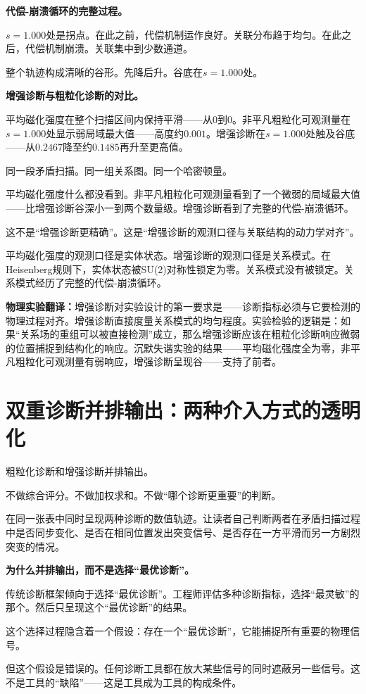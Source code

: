 \documentclass[11pt,a4paper]{book}
\theoremstyle{definition}
\begin{document}
\textbf{代偿-崩溃循环的完整过程。}

$s=1.000$处是拐点。在此之前，代偿机制运作良好。关联分布趋于均匀。在此之后，代偿机制崩溃。关联集中到少数通道。

整个轨迹构成清晰的谷形。先降后升。谷底在$s=1.000$处。

\textbf{增强诊断与粗粒化诊断的对比。}

平均磁化强度在整个扫描区间内保持平滑——从0到0。非平凡粗粒化可观测量在$s=1.000$处显示弱局域最大值——高度约$0.001$。增强诊断在$s=1.000$处触及谷底——从$0.2467$降至约$0.1485$再升至更高值。

同一段矛盾扫描。同一组关系图。同一个哈密顿量。

平均磁化强度什么都没看到。非平凡粗粒化可观测量看到了一个微弱的局域最大值——比增强诊断谷深小一到两个数量级。增强诊断看到了完整的代偿-崩溃循环。

这不是“增强诊断更精确”。这是“增强诊断的观测口径与关联结构的动力学对齐”。

平均磁化强度的观测口径是实体状态。增强诊断的观测口径是关系模式。在Heisenberg规则下，实体状态被SU(2)对称性锁定为零。关系模式没有被锁定。关系模式经历了完整的代偿-崩溃循环。

\textbf{物理实验翻译：}增强诊断对实验设计的第一要求是——诊断指标必须与它要检测的物理过程对齐。增强诊断直接度量关系模式的均匀程度。实验检验的逻辑是：如果“关系场的重组可以被直接检测”成立，那么增强诊断应该在粗粒化诊断响应微弱的位置捕捉到结构化的响应。沉默失谐实验的结果——平均磁化强度全为零，非平凡粗粒化可观测量有弱响应，增强诊断呈现谷——支持了前者。

\section{双重诊断并排输出：两种介入方式的透明化}

粗粒化诊断和增强诊断并排输出。

不做综合评分。不做加权求和。不做“哪个诊断更重要”的判断。

在同一张表中同时呈现两种诊断的数值轨迹。让读者自己判断两者在矛盾扫描过程中是否同步变化、是否在相同位置发出突变信号、是否存在一方平滑而另一方剧烈突变的情况。

\textbf{为什么并排输出，而不是选择“最优诊断”。}

传统诊断框架倾向于选择“最优诊断”。工程师评估多种诊断指标，选择“最灵敏”的那个。然后只呈现这个“最优诊断”的结果。

这个选择过程隐含着一个假设：存在一个“最优诊断”，它能捕捉所有重要的物理信号。

但这个假设是错误的。任何诊断工具都在放大某些信号的同时遮蔽另一些信号。这不是工具的“缺陷”——这是工具成为工具的构成条件。
\end{document}
